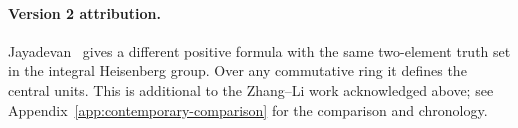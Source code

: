 
\paragraph{Version 2 attribution.}
Jayadevan~\cite{jayadevan-21-106} gives a different positive formula
with the same two-element truth set in the integral Heisenberg group.
Over any commutative ring it defines the central units. This is
additional to the Zhang--Li work acknowledged above; see
Appendix~\ref{app:contemporary-comparison} for the comparison and chronology.
